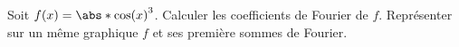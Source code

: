\begin{enonce}
\begin{exercise}[ID={RMS 124 1296},subtitle={Maple},tags={}]
  Soit $f(x)=\abs*{\cos(x)}^3$.
  Calculer les coefficients de Fourier de $f$.
  Représenter sur un même graphique $f$ et ses première sommes de Fourier.
\end{exercise}
\begin{solution}
\end{solution}
\end{enonce}
